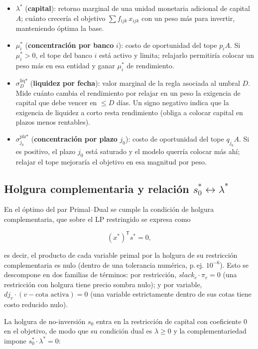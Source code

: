 \documentclass[11pt,a4paper]{article}
\newcommand{\T}{\mathsf{T}}
\begin{document}
\begin{itemize}
  \item $\lambda^*$ (\textbf{capital}): retorno marginal de una unidad monetaria adicional de capital $A$; cuánto crecería el objetivo $\sum f_{ijk}\,x_{ijk}$ con un peso más para invertir, manteniendo óptima la base.
  \item $\mu_i^*$ (\textbf{concentración por banco} $i$): costo de oportunidad del tope $p_i A$. Si $\mu_i^* > 0$, el tope del banco $i$ está activo y limita; relajarlo permitiría colocar un peso más en esa entidad y ganar $\mu_i^*$ de rendimiento.
  \item $\sigma^{\text{liq}*}_D$ (\textbf{liquidez por fecha}): valor marginal de la regla asociada al umbral $D$. Mide cuánto cambia el rendimiento por relajar en un peso la exigencia de capital que debe vencer en $\le D$ días. Un signo negativo indica que la exigencia de liquidez a corto resta rendimiento (obliga a colocar capital en plazos menos rentables).
  \item $\sigma^{\text{plz}*}_{j_0}$ (\textbf{concentración por plazo} $j_0$): costo de oportunidad del tope $q_{j_0} A$. Si es positivo, el plazo $j_0$ está saturado y el modelo querría colocar más ahí; relajar el tope mejoraría el objetivo en esa magnitud por peso.
\end{itemize}

\subsection{Holgura complementaria y relación $s_0^* \leftrightarrow \lambda^*$}

En el óptimo del par Primal--Dual se cumple la condición de holgura complementaria, que sobre el LP restringido se expresa como

\[
(x^*)^{\T} s^* = 0 ,
\]

es decir, el producto de cada variable primal por la holgura de su restricción complementaria es nulo (dentro de una tolerancia numérica, p.\,ej. $10^{-6}$). Esto se descompone en dos familias de términos: por restricción, $slack_c \cdot \pi_c = 0$ (una restricción con holgura tiene precio sombra nulo); y por variable, $dj_v \cdot (v - \text{cota activa}) = 0$ (una variable estrictamente dentro de sus cotas tiene costo reducido nulo).

La holgura de no-inversión $s_0$ entra en la restricción de capital con coeficiente $0$ en el objetivo, de modo que su condición dual es $\lambda \ge 0$ y la complementariedad impone $s_0^* \cdot \lambda^* = 0$:
\end{document}
